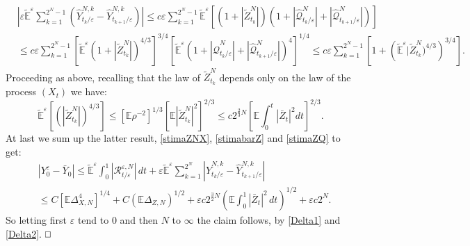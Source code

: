\documentclass[reqno,a4paper,11 pt]{article}
\def \E {\mathbb{E}}
\def \e {\varepsilon}
\numberwithin{equation}{section}
\def\finedim{{\hfill\hbox{\enspace${ \square}$}} \smallskip}    %
\def\sqr#1#2{{\vcenter{\vbox{\hrule height .#2pt
     \hbox{\vrule width .#2pt height#1pt \kern#1pt \vrule
     width .#2pt} \hrule height .#2pt}}}}
\def\square{\mathchoice\sqr54\sqr54\sqr{4.1}3\sqr{3.5}3}
\begin{document}
\begin{align*}
&\left|\e \widetilde{\E}^\e  \sum_{k=1}^{2^N-1} ( \hat{Y}^{N,k}_{t_{k}/\e}-\hat{Y}^{N,k}_{t_{k+1} /\e})\right|\leq c \e  \sum_{k=1}^{2^N-1} \widetilde{\E}^{\e}\left[ (1+|\widetilde{Z}^N_{t_k}|)(1+ |\hat{\mathcal{Q}}^N_{t_k/\e}|+|\hat{\mathcal{Q}}^N_{t_{k+1}/\e}|)\right]\\
& \leq  c\e \sum_{k=1}^{2^N-1} \left[\widetilde{\E}^{\e}  (1+|\widetilde{Z}^N_{t_k}|)^{4/3}\right]^{3/4}\left[\widetilde{\E}^{\e}(1+ |\hat{\mathcal{Q}}^N_{t_k/\e}|+|\hat{\mathcal{Q}}^N_{t_{k+1}/\e}|)^4\right]^{1/4}\leq c \e \sum_{k=1}^{2^N-1} \left[1+\left(\widetilde{\E}^{\e}  |\widetilde{Z}^N_{t_k})^{4/3}\right)^{3/4}\right].
\end{align*}
Proceeding as above, recalling that the law of  $\widetilde{Z}^N_{t_k}$ depends only on the law of the process $(X_t)$ we have:
$$\widetilde{\E}^{\e} [(|\widetilde{Z}^N_{t_k}| )^{4/3} ]\leq \left[{\E} \rho^{-2}\right]^{1/3} \left[\E |\widetilde{Z}^N_{t_k}|^{2}\right]^{2/3} \leq   c 2^{\frac{ 2}{3}N}\left [ \E\int_{0}^{t} |\bar{Z}_{t}|^2 dt  \right]^{2/3}.$$
At last we sum up the latter result,  \eqref{stimaZNX}, \eqref{stimabarZ} and \eqref{stimaZQ} to get:
\begin{align*}
&|Y^\e _0 -\bar Y_0 |\leq \widetilde{\E}^\e \int_0^{1} |\mathcal{R}^{\e,N}_{t/\e}| \, dt+ \e\widetilde{\E}^\e  \sum_{k=1}^{2^N}  |\hat{Y}^{N,k}_{t_{k}/\e}-\hat{Y}^{N,k}_{t_{k+1}/\e }|\\& \leq C[\E \Delta_{X,N}^4]^{1/4}+ C (\E\Delta_{Z,N})^{1/2}+ \e c  2^{\frac{3}{2} N}\left(\E\int_0^1 |\bar{Z}_t|^2 \, dt \right)^{1/2} +\e c 2^N.
\end{align*}
So letting first $\e$ tend to $0$ and then $N$ to $\infty$ the claim follows, by \eqref{Delta1} and \eqref{Delta2}.
\finedim
\end{document}
